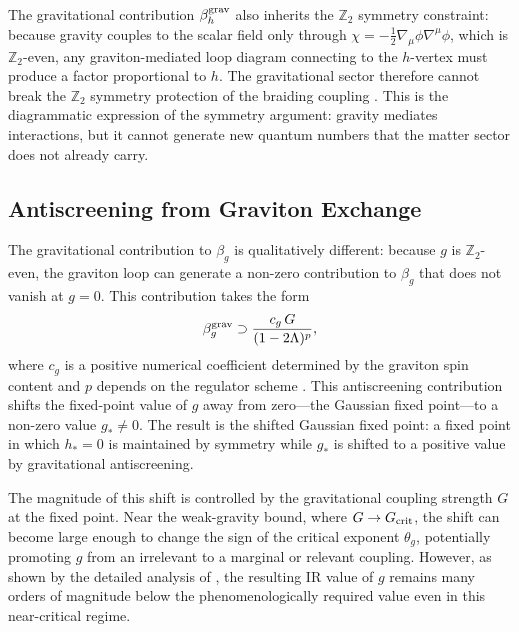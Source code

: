 \documentclass[12pt,a4paper]{article}
\begin{document}
The gravitational contribution $\beta_h^{\rm grav}$ also inherits the
$\mathbb{Z}_2$ symmetry constraint: because gravity couples to the scalar
field only through $\chi = -\tfrac{1}{2}\nabla_\mu\phi\nabla^\mu\phi$, which
is $\mathbb{Z}_2$-even, any graviton-mediated loop diagram connecting to the
$h$-vertex must produce a factor proportional to $h$. The gravitational sector
therefore cannot break the $\mathbb{Z}_2$ symmetry protection of the braiding
coupling \cite{EichhornLinoWagner2023,EichhornSchiffer2022handbook}. This is
the diagrammatic expression of the symmetry argument: gravity mediates
interactions, but it cannot generate new quantum numbers that the matter sector
does not already carry.

\subsection{Antiscreening from Graviton Exchange}

The gravitational contribution to $\beta_g$ is qualitatively different: because
$g$ is $\mathbb{Z}_2$-even, the graviton loop can generate a non-zero
contribution to $\beta_g$ that does not vanish at $g = 0$. This contribution
takes the form
\begin{equation}
\beta_g^{\rm grav} \supset \frac{c_g\,G}{(1 - 2\Lambda)^p},
\end{equation}
where $c_g$ is a positive numerical coefficient determined by the graviton spin
content and $p$ depends on the regulator scheme \cite{Percacci2017,
EichhornLinoWagner2023}. This antiscreening contribution shifts the fixed-point
value of $g$ away from zero---the Gaussian fixed point---to a non-zero value
$g_* \neq 0$. The result is the shifted Gaussian fixed point: a fixed point in
which $h_* = 0$ is maintained by symmetry while $g_*$ is shifted to a positive
value by gravitational antiscreening.

The magnitude of this shift is controlled by the gravitational coupling strength
$G$ at the fixed point. Near the weak-gravity bound, where $G \to G_{\rm crit}$,
the shift can become large enough to change the sign of the critical exponent
$\theta_g$, potentially promoting $g$ from an irrelevant to a marginal or relevant
coupling. However, as shown by the detailed analysis of \cite{EichhornLinoWagner2023},
the resulting IR value of $g$ remains many orders of magnitude below the
phenomenologically required value even in this near-critical regime.

\end{document}
